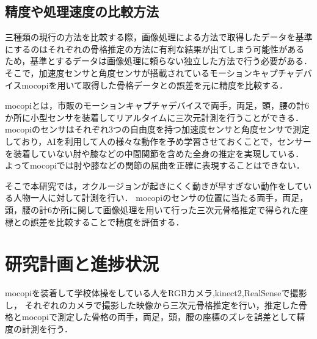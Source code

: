 \documentclass[titlepage]{jarticle}
\begin{document}
\subsection{精度や処理速度の比較方法}
%
三種類の現行の方法を比較する際，画像処理による方法で取得したデータを基準にするのはそれぞれの骨格推定の方法に有利な結果が出てしまう可能性があるため，基準とするデータは画像処理に頼らない独立した方法で行う必要がある．
そこで，加速度センサと角度センサが搭載されているモーションキャプチャデバイスmocopi\cite{mocopi}を用いて取得した骨格データとの誤差を元に精度を比較する．

mocopiとは，市販のモーションキャプチャデバイスで両手，両足，頭，腰の計6か所に小型センサを装着してリアルタイムに三次元計測を行うことができる．
mocopiのセンサはそれぞれ3つの自由度を持つ加速度センサと角度センサで測定しており，AIを利用して人の様々な動作を予め学習させておくことで，センサーを装着していない肘や膝などの中間関節を含めた全身の推定を実現している．
よってmocopiでは肘や膝などの関節の屈曲を正確に表現することはできない．

そこで本研究では，オクルージョンが起きにくく動きが早すぎない動作をしている人物一人に対して計測を行い．
mocopiのセンサの位置に当たる両手，両足，頭，腰の計6か所に関して画像処理を用いて行った三次元骨格推定で得られた座標との誤差を比較することで精度を評価する．
%
%
%

%
%
%
%
%

%
%
%
%
\section{研究計画と進捗状況}
%

%
%
%
mocopiを装着して学校体操をしている人をRGBカメラ,kinect2,RealSenseで撮影し，
それぞれのカメラで撮影した映像から三次元骨格推定を行い，推定した骨格とmocopiで測定した骨格の両手，両足，頭，腰の座標のズレを誤差として精度の計測を行う．
\end{document}
